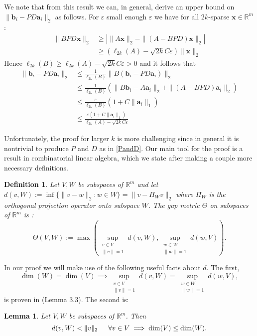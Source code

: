 \documentclass[journal, onecolumn]{IEEEtran}
\newtheorem{lemma}{Lemma}
\newtheorem{definition}{Definition}
\begin{document}
We note that from this result we can, in general, derive an upper bound on $\|\mathbf{b}_i - PD\mathbf{a}_i\|_2$ as follows. For $\varepsilon$ small enough $\varepsilon$ we have for all $2k$-sparse $\mathbf{x} \in \mathbb{R}^m$:
\begin{align*}
\|BPD\mathbf{x}\|_2 &\geq | \|A\mathbf{x}\|_2 - \|(A-BPD)\mathbf{x}\|_2 | \\
&\geq (\ell_{2k}(A) - \sqrt{2k}C\varepsilon ) \|\mathbf{x}\|_2
\end{align*}
Hence $\ell_{2k}(B) \geq \ell_{2k}(A) - \sqrt{2k}C\varepsilon > 0$ and it follows that
\begin{align*}
\|\mathbf{b}_i - PD\mathbf{a}_i\|_2
&\leq \frac{1}{\ell_{2k}(B)}\|B(\mathbf{b}_i - PD\mathbf{a}_i)\|_2 \\
&\leq \frac{1}{\ell_{2k}(B)} (\|B\mathbf{b}_i - A\mathbf{a}_i\|_2 + \|(A - BPD)\mathbf{a}_i\|_2) \\
&\leq \frac{\varepsilon}{\ell_{2k}(B)}(1+C\|\mathbf{a}_i\|_1) \\
&\leq \frac{\varepsilon(1+C\|\mathbf{a}_i\|_1)}{\ell_{2k}(A) - \sqrt{2k}C\varepsilon}
\end{align*}



Unfortunately, the proof for larger $k$ is more challenging since in general it is nontrivial to produce $P$ and $D$ as in \eqref{PandD}. Our main tool for the proof is a result in combinatorial linear algebra, which we state after making a couple more necessary definitions.

\begin{definition}
Let $V, W$ be subspaces of $\mathbb{R}^m$ and let $d(v,W) := \inf\{\|v-w\|_2: w \in W\} = \|v - \Pi_W v\|_2$ where $\Pi_W$ is the orthogonal projection operator onto subspace $W$. The \emph{gap} metric $\Theta$ on subspaces of $\mathbb{R}^{m}$ is \cite{TheoryOfLinearOperatorsPage69}:
\begin{equation}\label{SubspaceMetric}
\Theta(V,W) := \max\left( \sup_{\substack{v \in V \\ \|v\| = 1}} d(v,W), \sup_{\substack{w \in W \\ \|w\| = 1}} d(w,V) \right).
\end{equation}
\end{definition}
%
In our proof we will make use of the following useful facts about $d$. The first, 
\begin{equation}\label{SubspaceMetricSameDim}
\dim(W) = \dim(V) \implies \sup_{\substack{v \in V \\ \|v\| = 1}}  d(v,W)  = \sup_{\substack{w \in W \\ \|w\| = 1}} d(w,V),
\end{equation}
%
is proven in \cite{Morris10} (Lemma 3.3). The second is:
\begin{lemma}\label{MinDimLemma}
Let $V, W$ be subspaces of $\mathbb{R}^{m}$. Then
\begin{equation}\label{MinDim}
d(v,W) < \|v\|_2 \indent \forall v \in V \implies \dim(V) \leq \dim(W).
\end{equation}
\end{lemma}
\end{document}
